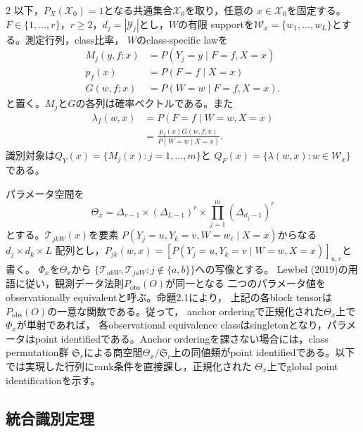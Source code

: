 \documentclass[a4paper,10pt]{article}
\begin{document}
\begin{multicols}{2}
以下，$P_X(\mathcal X_0)=1$となる共通集合$\mathcal X_0$を取り，任意の
$x\in\mathcal X_0$を固定する。
$F\in\{1,\ldots,r\}$，$r\ge2$，$d_j=|\mathcal Y_j|$とし，$W$の有限
supportを$\mathcal W_x=\{w_1,\ldots,w_L\}$とする。測定行列，class比率，
$W$のclass-specific lawを
\begin{subequations}\label{eq:latent-class-components}
\begin{align}
M_j(y,f;x)&=P(Y_j=y\mid F=f,X=x)
  \label{eq:measurement-kernel-definition}\\
p_f(x)&=P(F=f\mid X=x)
  \label{eq:class-proportion-definition}\\
G(w,f;x)&=P(W=w\mid F=f,X=x).
  \label{eq:shifter-law-definition}
\end{align}
\end{subequations}
と置く。$M_j$と$G$の各列は確率ベクトルである。また
\begin{equation}
\begin{aligned}
\lambda_f(w,x)
 &=P(F=f\mid W=w,X=x)\\
 &=\frac{p_f(x)G(w,f;x)}{P(W=w\mid X=x)}.
\end{aligned}
\label{eq:latent-class-posterior}
\end{equation}
識別対象は$Q_Y(x)=\{M_j(x):j=1,\ldots,m\}$と
$Q_F(x)=\{\lambda(w,x):w\in\mathcal W_x\}$である。

パラメータ空間を
\begin{equation}
\Theta_x=\Delta_{r-1}\times(\Delta_{L-1})^r
\times\prod_{j=1}^m(\Delta_{d_j-1})^r
\label{eq:latent-parameter-space}
\end{equation}
とする。$\mathcal T_{jkW}(x)$を要素
$P(Y_j=u,Y_k=v,W=w_\ell\mid X=x)$からなる$d_j\times d_k\times L$
配列とし，$P_{jk}(w,x)=[P(Y_j=u,Y_k=v\mid W=w,X=x)]_{u,v}$と書く。
$\Phi_x$を$\Theta_x$から
$\{\mathcal T_{abW},\mathcal T_{jaW}:j\notin\{a,b\}\}$への写像とする。
Lewbel (2019)の用語に従い，観測データ法則$P_{\mathrm{obs}}(O)$が同一となる
二つのパラメータ値をobservationally equivalentと呼ぶ。命題2.1により，
上記の各block tensorは$P_{\mathrm{obs}}(O)$の一意な関数である。従って，
anchor orderingで正規化された$\Theta_x$上で$\Phi_x$が単射であれば，
各observational equivalence classはsingletonとなり，パラメータはpoint
identifiedである。Anchor orderingを課さない場合には，class permutation群
$\mathfrak S_r$による商空間$\Theta_x/\mathfrak S_r$上の同値類がpoint
identifiedである。以下では実現した行列にrank条件を直接課し，正規化された
$\Theta_x$上でglobal point identificationを示す。

\subsection{統合識別定理}


\end{multicols}
\end{document}
